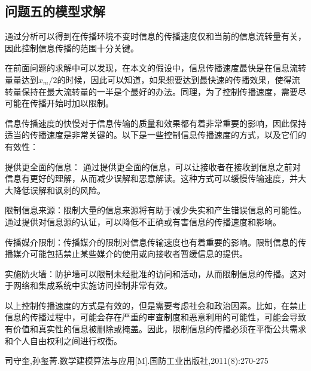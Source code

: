 \documentclass[UTF8]{ctexart}
\begin{document}
\subsection{问题五的模型求解}
通过分析可以得到在传播环境不变时信息的传播速度仅和当前的信息流转量有关，因此控制信息传播的范围十分关键。\par
在前面问题的求解中可以发现，在本文的假设中，信息传播速度最快是在信息流转量量达到$x_m/2$的时候，因此可以知道，如果想要达到最快速的传播效果，使得流转量保持在最大流转量的一半是个最好的办法。同理，为了控制传播速度，需要尽可能在传播开始时加以限制。\par
信息传播速度的快慢对于信息传输的质量和效果都有着非常重要的影响，因此保持适当的传播速度是非常关键的。以下是一些控制信息传播速度的方式，以及它们的有效性：\par
提供更全面的信息： 通过提供更全面的信息，可以让接收者在接收到信息之前对信息有更好的理解，从而减少误解和恶意解读。这种方式可以缓慢传输速度，并大大降低误解和讽刺的风险。\par
限制信息来源：限制大量的信息来源将有助于减少失实和产生错误信息的可能性。通过提供对信息源的认证，可以降低不正确或有害信息的传播速度和影响。\par
传播媒介限制：传播媒介的限制对信息传输速度也有着重要的影响。限制信息的传播媒介可能包括禁止某些媒介的使用或向接收者暂缓信息的提供。\par
实施防火墙：防护墙可以限制未经批准的访问和活动，从而限制信息的传播。这对于网络和集成系统中实施访问控制非常有效。\par
以上控制传播速度的方式是有效的，但是需要考虑社会和政治因素。比如，在禁止信息的传播过程中，可能会存在严重的审查制度和恶意利用的可能性，可能会导致有价值和真实性的信息被删除或掩盖。因此，限制信息的传播必须在平衡公共需求和个人自由权利之间进行权衡。\par
\begin{thebibliography}{40}
	司守奎,孙玺菁.数学建模算法与应用[M].国防工业出版社,2011(8):270-275
	
	
	
	
\end{thebibliography}
\newpage
{}	%
\end{document}
